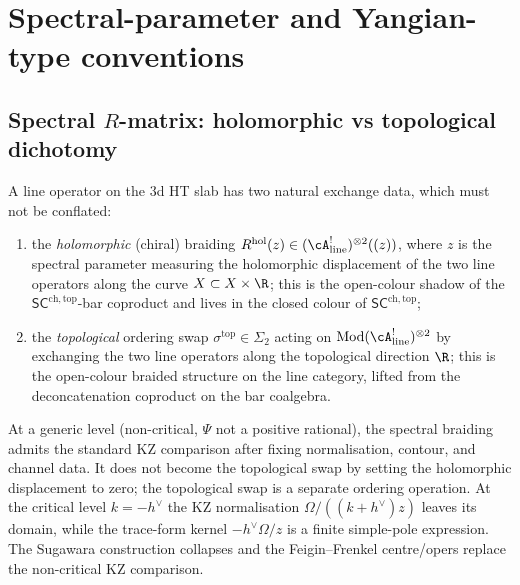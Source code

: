 \section{Spectral-parameter and Yangian-type conventions}
\label{sec:line-operators-conventions}

\subsection{Spectral $R$-matrix: holomorphic vs topological dichotomy}
\label{subsec:line-operators-hol-top-dichotomy}

\begin{remark}
\label{rem:line-operators-hol-top-dichotomy}
A line operator on the $3$d HT slab has two natural exchange data,
which must not be conflated:
\begin{enumerate}[label=\textup{(\roman*)}]
\item the \emph{holomorphic} (chiral) braiding
$R^{\mathrm{hol}}(z) \in (\cA^!_{\mathrm{line}})^{\otimes 2}((z))$,
where $z$ is the spectral parameter measuring the holomorphic
displacement of the two line operators along the curve $X\subset
X\times\R$; this is the open-colour shadow of the
$\mathsf{SC}^{\mathrm{ch,top}}$-bar coproduct and lives in the closed
colour of $\mathsf{SC}^{\mathrm{ch,top}}$;
\item the \emph{topological} ordering swap
$\sigma^{\mathrm{top}} \in \Sigma_2$ acting on
$\mathrm{Mod}(\cA^!_{\mathrm{line}})^{\otimes 2}$ by exchanging the
two line operators along the topological direction $\R$; this is
the open-colour braided structure on the line category, lifted from
the deconcatenation coproduct on the bar coalgebra.
\end{enumerate}
At a generic level (non-critical, $\Psi$ not a positive rational),
the spectral braiding admits the standard KZ comparison after fixing
normalisation, contour, and channel data. It does not become the
topological swap by setting the holomorphic displacement to zero; the
topological swap is a separate ordering operation. At the critical
level $k=-h^\vee$ the KZ normalisation
$\Omega/((k+h^\vee)z)$ leaves its domain, while the trace-form kernel
$-h^\vee\Omega/z$ is a finite simple-pole expression. The
Sugawara construction collapses and the Feigin--Frenkel centre/opers
replace the non-critical KZ comparison.
\end{remark}

